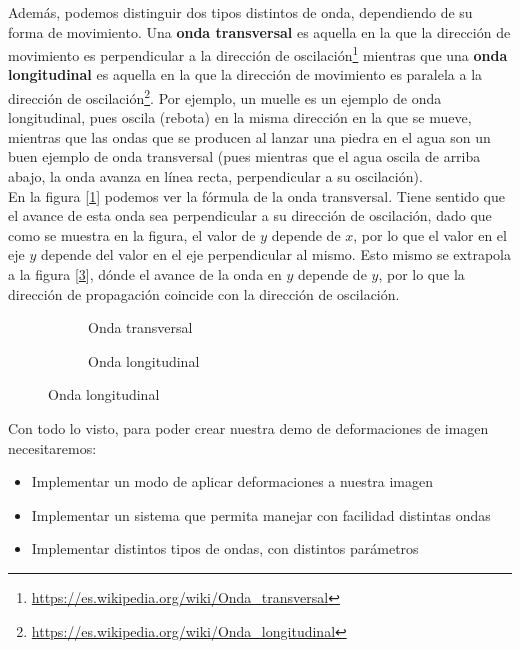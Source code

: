 Además, podemos distinguir dos tipos distintos de onda, dependiendo de su forma de movimiento. Una \textbf{onda transversal} es aquella en la que la dirección de movimiento es perpendicular a la dirección de oscilación\footnote{\url{https://es.wikipedia.org/wiki/Onda_transversal}} mientras que una \textbf{onda longitudinal} es aquella en la que la dirección de movimiento es paralela a la dirección de oscilación\footnote{\url{https://es.wikipedia.org/wiki/Onda_longitudinal}}. Por ejemplo, un muelle es un ejemplo de onda longitudinal, pues oscila (rebota) en la misma dirección en la que se mueve, mientras que las ondas que se producen al lanzar una piedra en el agua son un buen ejemplo de onda transversal (pues mientras que el agua oscila de arriba abajo, la onda avanza en línea recta, perpendicular a su oscilación).\\

En la figura [\ref{fig:transversalwave}] podemos ver la fórmula de la onda transversal. Tiene sentido que el avance de esta onda sea perpendicular a su dirección de oscilación, dado que como se muestra en la figura, el valor de \(y\) depende de \(x\), por lo que el valor en el eje \(y\) depende del valor en el eje perpendicular al mismo. Esto mismo se extrapola a la figura [\ref{fig:longitudinalwave}], dónde el avance de la onda en \(y\) depende de \(y\), por lo que la dirección de propagación coincide con la dirección de oscilación.\\

\begin{figure}[h]
	\centering
	\begin{subfigure}[b]{0.45\textwidth}
		\centering
		\caption{Onda transversal}
		\label{fig:transversalwave}
	\end{subfigure}
	\begin{subfigure}[b]{0.45\textwidth}
		\centering
		\caption{Onda longitudinal}
		\label{fig:longitudinalwave}
	\end{subfigure}
\end{figure}

Con todo lo visto, para poder crear nuestra demo de deformaciones de imagen necesitaremos:

\begin{itemize}
	\item Implementar un modo de aplicar deformaciones a nuestra imagen 
	\item Implementar un sistema que permita manejar con facilidad distintas ondas	
	\item Implementar distintos tipos de ondas, con distintos parámetros
\end{itemize}

